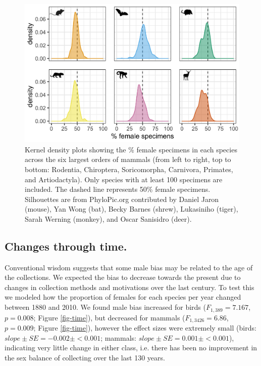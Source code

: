 \documentclass[a4paper, 12pt]{article}
\begin{document}
\begin{figure}
 \centering
  \includegraphics[width = \linewidth]{figures/orders-density-mammals-six.png}
  \caption{Kernel density plots showing the \% female specimens in each species across the six largest orders of mammals (from left to right, top to bottom: Rodentia, Chiroptera, Soricomorpha, Carnivora, Primates, and Artiodactyla). 
  Only species with at least 100 specimens are included. 
  The dashed line represents 50\% female specimens. 
  Silhouettes are from PhyloPic.org contributed by Daniel Jaron (mouse), Yan Wong (bat), Becky Barnes (shrew), Lukasiniho (tiger), Sarah Werning (monkey), and Oscar Sanisidro (deer).
}
  \label{fig-mammal_order_six}
\end{figure}


\subsection{Changes through time.}
Conventional wisdom suggests that some male bias may be related to the age of the collections. 
We expected the bias to decrease towards the present due to changes in collection methods and motivations over the last century. 
To test this we modeled how the proportion of females for each species per year changed between 1880 and 2010. 
We found male bias increased for birds ($F_{1, 389} = 7.167$, $p = 0.008$; Figure \ref{fig-time}), but decreased for mammals ($F_{1, 3426} = 6.86$, $p = 0.009$; Figure \ref{fig-time}), however the effect sizes were extremely small (birds: $slope \pm SE = -0.002 \pm < 0.001$; mammals: $slope \pm SE = 0.001 \pm < 0.001$), indicating very little change in either class, i.e. there has been no improvement in the sex balance of collecting over the last 130 years.
\end{document}
